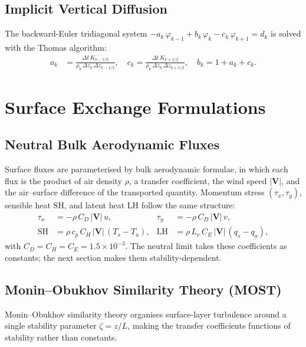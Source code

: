 \documentclass[11pt,twoside]{report}
\newcommand{\cpd}{c_p}
\newcommand{\Lv}{L_v}
\newcommand{\vect}[1]{\bm{#1}}
\begin{document}
\subsection{Implicit Vertical Diffusion}

The backward-Euler tridiagonal system
$-a_k\,\varphi_{k-1}+b_k\,\varphi_k-c_k\,\varphi_{k+1}=d_k$ is solved
with the Thomas algorithm:
\begin{align}
  a_k &= \frac{\Delta t\,K_{k-1/2}}{\rho_k\,\Delta z_k\,\Delta z_{k-1/2}},
  \quad c_k = \frac{\Delta t\,K_{k+1/2}}{\rho_k\,\Delta z_k\,\Delta z_{k+1/2}},
  \quad b_k = 1+a_k+c_k.
\end{align}


\section{Surface Exchange Formulations}
\label{sec:surface}

\subsection{Neutral Bulk Aerodynamic Fluxes}

Surface fluxes are parameterised by bulk aerodynamic formulae, in which each
flux is the product of air density $\rho$, a transfer coefficient, the wind
speed $|\vect{V}|$, and the air--surface difference of the transported
quantity. Momentum stress $(\tau_x,\tau_y)$, sensible heat $\mathrm{SH}$, and
latent heat $\mathrm{LH}$ follow the same structure:
\begin{align}
  \tau_x &= -\rho\,C_D\,|\vect{V}|\,u, &
  \tau_y &= -\rho\,C_D\,|\vect{V}|\,v, \\
  \mathrm{SH} &= \rho\,\cpd\,C_H\,|\vect{V}|\,(T_s-T_a), &
  \mathrm{LH} &= \rho\,\Lv\,C_E\,|\vect{V}|\,(q_s-q_a),
\end{align}
with $C_D=C_H=C_E=1.5\times10^{-3}$. The neutral limit takes these
coefficients as constants; the next section makes them stability-dependent.

\subsection{Monin--Obukhov Similarity Theory (MOST)}

Monin--Obukhov similarity theory \citep{MoninObukhov1954} organises
surface-layer turbulence around a single stability parameter $\zeta=z/L$,
making the transfer coefficients functions of stability rather than constants.
\end{document}
